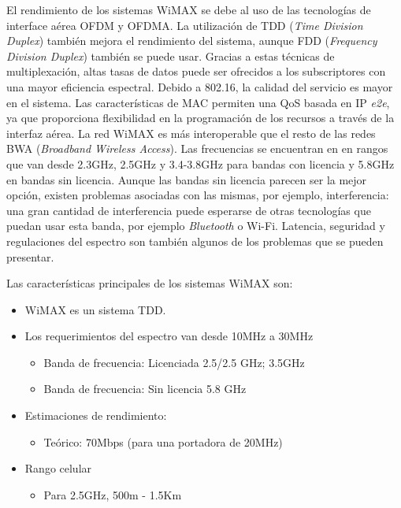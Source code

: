 \documentclass[10pt,journal,compsoc]{IEEEtran}
\begin{document}
El rendimiento de los sistemas WiMAX se debe al uso de las tecnologías de interface aérea OFDM y OFDMA. La utilización de TDD (\emph{Time Division Duplex}) también mejora el rendimiento del sistema, aunque FDD (\emph{Frequency Division Duplex}) también se puede usar. Gracias a estas técnicas de multiplexación, altas tasas de datos puede ser ofrecidos a los subscriptores con una mayor eficiencia espectral. Debido a 802.16, la calidad del servicio es mayor en el sistema. Las características de MAC permiten una QoS basada en IP \emph{e2e}, ya que proporciona flexibilidad en la programación de los recursos a través de la interfaz aérea. La red WiMAX es más interoperable que el resto de las redes BWA (\emph{Broadband Wireless Access}). Las frecuencias se encuentran en en rangos que van desde 2.3GHz, 2.5GHz y 3.4-3.8GHz para bandas con licencia y 5.8GHz en bandas sin licencia. Aunque las bandas sin licencia parecen ser la mejor opción, existen problemas asociadas con las mismas, por ejemplo, interferencia: una gran cantidad de interferencia puede esperarse de otras tecnologías que puedan usar esta banda, por ejemplo \emph{Bluetooth} o Wi-Fi. Latencia, seguridad y regulaciones del espectro son también algunos de los problemas que se pueden presentar.

Las características principales de los sistemas WiMAX son:
\begin{itemize}
    \item WiMAX es un sistema TDD.
    \item Los requerimientos del espectro van desde 10MHz a 30MHz
    \begin{itemize}
        \item Banda de frecuencia: Licenciada 2.5/2.5 GHz; 3.5GHz
        \item Banda de frecuencia: Sin licencia 5.8 GHz
    \end{itemize}
    \item Estimaciones de rendimiento:
    \begin{itemize}
        \item Teórico: 70Mbps (para una portadora de 20MHz)
    \end{itemize}
    \item Rango celular
    \begin{itemize}
        \item Para 2.5GHz, 500m - 1.5Km
    \end{itemize}
\end{itemize}
\end{document}

